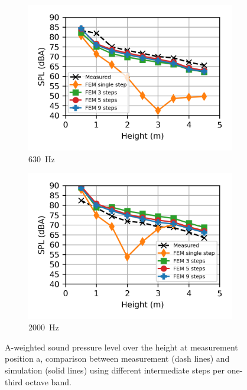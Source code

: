 \begin{figure}
\begin{subfigure}[b]{0.49\textwidth}
		\includegraphics{fig/chap5/freq_steps/third_octave_over_height/630_Hz.png}
		\caption{\SI{630}{\hertz}}
	\end{subfigure}
	\hfill
	\begin{subfigure}[b]{0.49\textwidth}
		\centering
		\includegraphics{fig/chap5/freq_steps/third_octave_over_height/2000_Hz.png}
		\caption{\SI{2000}{\hertz}}
		\label{fig:curve_sink}
	\end{subfigure}
	
	\caption{A-weighted sound pressure level over the height at measurement position a, comparison between measurement (dash lines) and simulation (solid lines) using different intermediate steps per one-third octave band.}
	
	\label{fig:third_octave_over_height_freq_steps}
\end{figure}

